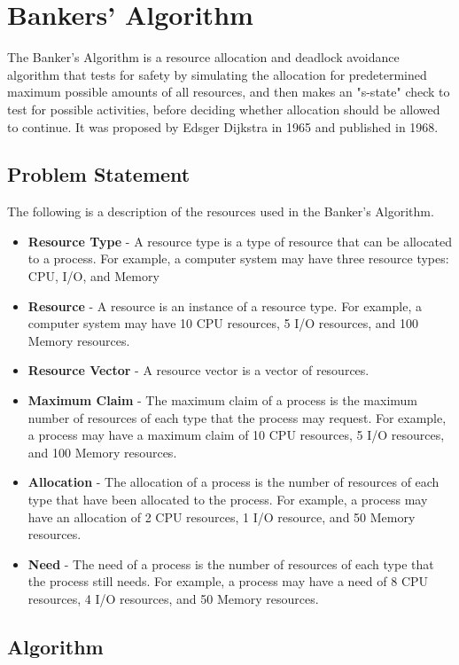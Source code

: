 \section{Bankers' Algorithm}
\label{sec:bankers}

The Banker's Algorithm is a resource allocation and deadlock
avoidance algorithm that tests for safety by simulating the
allocation for predetermined maximum possible amounts of all
resources, and then makes an "s-state" check to test for possible
activities, before deciding whether allocation should be allowed to continue.
It was proposed by Edsger Dijkstra in 1965 and published in 1968.

\subsection{Problem Statement}

The following is a description of the resources used in the Banker's Algorithm.

\begin{itemize}
	\item \textbf{Resource Type} - A resource type is a type of resource that can be allocated to a process. For example, a computer system may have three resource types: CPU, I/O, and Memory\
	\item \textbf{Resource} - A resource is an instance of a resource type. For example, a computer system may have 10 CPU resources, 5 I/O resources, and 100 Memory resources.
	\item \textbf{Resource Vector} - A resource vector is a vector of resources.
	\item \textbf{Maximum Claim} - The maximum claim of a process is the maximum number of resources of each type that the process may request. For example, a process may have a maximum claim of 10 CPU resources, 5 I/O resources, and 100 Memory resources.
	\item \textbf{Allocation} - The allocation of a process is the number of resources of each type that have been allocated to the process. For example, a process may have an allocation of 2 CPU resources, 1 I/O resource, and 50 Memory resources.
	\item \textbf{Need} - The need of a process is the number of resources of each type that the process still needs. For example, a process may have a need of 8 CPU resources, 4 I/O resources, and 50 Memory resources.
\end{itemize}

\subsection{Algorithm}

